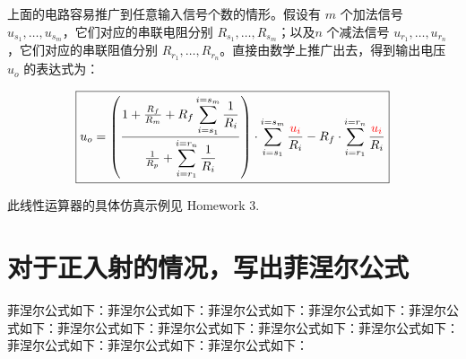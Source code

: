 \documentclass[a4paper]{article}  %
\theoremstyle{MyLineTheoremStyle} %
\theoremstyle{MyBlockTheoremStyle} %
\theoremstyle{MySubsubsectionStyle} %
\begin{document}
\begin{multicols*}{4}
上面的电路容易推广到任意输入信号个数的情形。假设有 $m$ 个加法信号 $u_{s_1}, \dots, u_{s_m}$，它们对应的串联电阻分别 $R_{s_1}, \dots, R_{s_m}$；以及$n$ 个减法信号 $u_{r_1}, \dots, u_{r_n}$，它们对应的串联阻值分别 $R_{r_1}, \dots, R_{r_n}$。直接由数学上推广出去，得到输出电压 
$u_o$ 的表达式为：

\begin{equation}
\boxed{
u_o = 
\left(
    \frac{1 + \frac{R_f}{R_m} + \displaystyle R_f\sum_{i=s_1}^{i=s_m} \frac{1}{R_i}
    }{
        \frac{1}{R_p} + \displaystyle \sum_{i=r_1}^{i=r_n} \frac{1}{R_i}
    }
\right)\cdot \displaystyle\sum_{i=s_1}^{i=s_m} \frac{{\color{red} u_i}}{R_i}  - R_f \cdot  \displaystyle\sum_{i=r_1}^{i=r_n} \frac{{\color{red} u_i}}{R_i}
}
\end{equation}

此线性运算器的具体仿真示例见 Homework 3.

\section{对于正入射的情况，写出菲涅尔公式}

菲涅尔公式如下：菲涅尔公式如下：菲涅尔公式如下：菲涅尔公式如下：菲涅尔公式如下：菲涅尔公式如下：菲涅尔公式如下：菲涅尔公式如下：菲涅尔公式如下：菲涅尔公式如下：菲涅尔公式如下：菲涅尔公式如下：

\begin{table}[H]
\end{table}



\end{multicols*}
\end{document}
